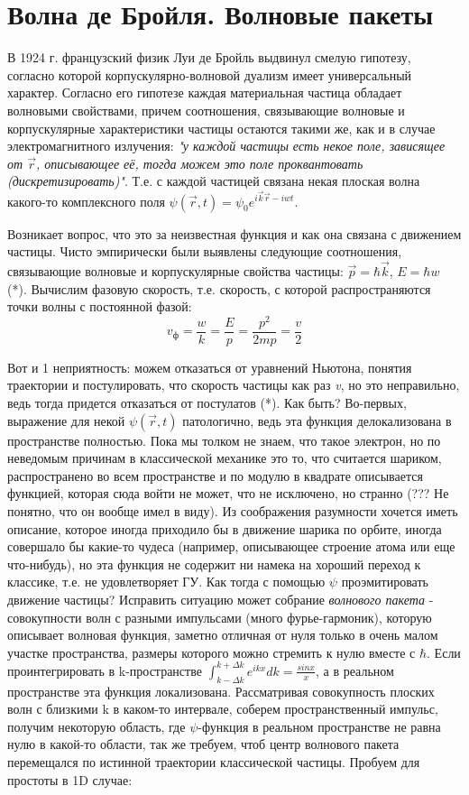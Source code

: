 \newpage
\chapter{Волна де Бройля. Волновые пакеты}
\par  В 1924 г. французский физик Луи де Бройль выдвинул смелую гипотезу, согласно которой корпускулярно-волновой дуализм имеет универсальный характер. Согласно его гипотезе каждая материальная частица обладает волновыми свойствами, причем соотношения, связывающие волновые и корпускулярные характеристики частицы остаются такими же, как и в случае электромагнитного излучения: \textit{"у каждой частицы есть некое поле, зависящее от $\vec{r}$, описывающее её, тогда можем это поле проквантовать (дискретизировать)"}. Т.е. с каждой частицей связана некая плоская волна какого-то комплексного поля $ \psi (\vec{r}, t) =\psi _0 e^{i \vec{k} \vec{r} - i w t} $.
\par Возникает вопрос, что это за неизвестная функция и как она связана с движением частицы. Чисто эмпирически были выявлены следующие соотношения, связывающие волновые и корпускулярные свойства частицы: $\vec{p} = \hbar \vec{k}$, $E= \hbar w$ (*). Вычислим фазовую скорость, т.е. скорость, с которой распространяются точки волны с постоянной фазой:
$$ v_ф = \frac{w}{k} = \frac{E}{p} = \frac{p^2}{2mp}= \frac{v}{2} $$
\par Вот и 1 неприятность: можем отказаться от уравнений Ньютона, понятия траектории и постулировать, что скорость частицы как раз \textit{v}, но это неправильно, ведь тогда придется отказаться от постулатов (*). Как быть? Во-первых, выражение для некой $ \psi (\vec{r}, t) $ патологично, ведь эта функция делокализована в пространстве полностью. Пока мы толком не знаем, что такое электрон, но по неведомым причинам в классической механике это то, что считается шариком, распространено во всем пространстве и по модулю в квадрате описывается функцией, которая сюда войти не может, что не исключено, но странно (??? Не понятно, что он вообще имел в виду).  Из соображения разумности хочется иметь описание, которое иногда приходило бы в движение шарика по орбите, иногда совершало бы какие-то чудеса (например, описывающее строение атома или еще что-нибудь), но эта функция не содержит ни намека на хороший переход к классике, т.е. не удовлетворяет ГУ. Как тогда с помощью $\psi$ проэмитировать движение частицы? Исправить ситуацию может собрание \textit{волнового пакета} - совокупности волн с разными импульсами (много фурье-гармоник), которую описывает волновая функция, заметно отличная от нуля только в очень малом участке пространства, размеры которого можно стремить к нулю вместе с $\hbar$. Если проинтегрировать в k-пространстве $\int_{k- \Delta k}^{k+ \Delta k} e^{ikx} dk = \frac{sin x}{x}$, а в реальном пространстве эта функция локализована. Рассматривая совокупность плоских волн с близкими k в каком-то интервале, соберем пространственный импульс, получим некоторую область, где $\psi$-функция в реальном пространстве не равна нулю в какой-то области, так же требуем, чтоб центр волнового пакета перемещался по истинной траектории классической частицы. Пробуем для простоты в 1D случае:
